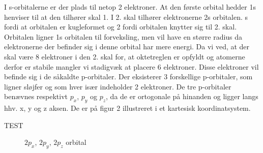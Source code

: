 \documentclass[12pt,a4paper]{article}
\theoremstyle{break}
\theoremstyle{nonumberplain}
\begin{document}
  I s-orbitalerne er der plads til netop 2 elektroner. At den første orbital hedder 1s henviser til at den tilhører skal 1. I 2. skal tilhører elektronerne 2s orbitalen. s fordi at orbitalen er kugleformet og 2 fordi orbitalen knytter sig til 2. skal. Orbitalen ligner 1s orbitalen til forveksling, men vil have en større radius da elektronerne der befinder sig i denne orbital har mere energi. Da vi ved, at der skal være 8 elektroner i den 2. skal for, at oktetreglen er opfyldt og atomerne derfor er stabile mangler vi stadigvæk at placere 6 elektroner. Disse elektroner vil befinde sig i de såkaldte p-orbitaler. Der eksisterer 3 forskellige p-orbitaler, som ligner sløjfer og som hver især indeholder 2 elektroner. De tre p-orbitaler benævnes respektivt $p_x$, $p_y$ og $p_z$, da de er ortogonale på hinanden og ligger langs hhv. x, y og z aksen. De er på figur 2 illustreret i et kartesisk koordinatsystem.
  
TEST
 
\begin{figure}[ht!]
  \centering
  \caption{$2p_x$, $2p_y$, $2p_z$ orbital} \end{figure}
\end{document}
